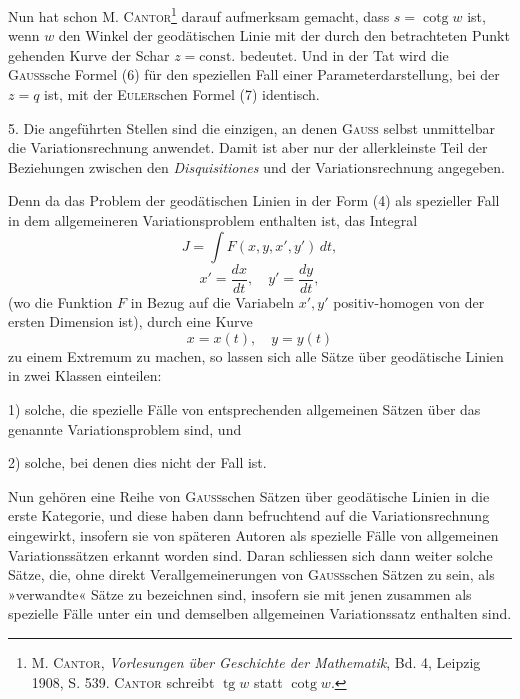 Nun hat schon M. \textsc{Cantor}\footnote{M. \textsc{Cantor}, \textit{Vorlesungen über Geschichte der Mathematik}, Bd. 4, Leipzig 1908, S. 539. \textsc{Cantor}
schreibt $\operatorname{tg} w$ statt $\operatorname{cotg} w$.} darauf aufmerksam gemacht, dass $s=\operatorname{cotg} w$
ist, wenn $w$ den Winkel der geodätischen Linie mit der durch den betrachteten
Punkt gehenden Kurve der Schar $z=\text{const.}$ bedeutet. Und in der Tat wird
die \textsc{Gauss}sche Formel (6) für den speziellen Fall einer Parameterdarstellung,
bei der $z=q$ ist, mit der \textsc{Euler}schen Formel (7) identisch.
\begin{center}\end{center}
\noindent\hspace*{\parindent}5. Die angeführten Stellen sind die einzigen, an denen \textsc{Gauss} selbst
unmittelbar die Variationsrechnung anwendet. Damit ist aber nur der allerkleinste
Teil der Beziehungen zwischen den \textit{Disquisitiones} und der Variationsrechnung
angegeben.

Denn da das Problem der geodätischen Linien in der Form (4) als spezieller
Fall in dem allgemeineren Variationsproblem enthalten ist, das Integral
\begin{equation*}\tag{8}
J=\int F(x,y,x',y')\,dt,
\end{equation*}
\[
x'=\frac{dx}{dt},\quad y'=\frac{dy}{dt},
\]
(wo die Funktion $F$ in Bezug auf die Variabeln $x',y'$ positiv-homogen von
der ersten Dimension ist), durch eine Kurve
\[
x=x(t),\quad y=y(t)
\]
zu einem Extremum zu machen, so lassen sich alle Sätze über geodätische
Linien in zwei Klassen einteilen:
\par\noindent\hspace*{\parindent}1) solche, die spezielle Fälle von entsprechenden allgemeinen Sätzen über
das genannte Variationsproblem sind, und
\par\noindent\hspace*{\parindent}2) solche, bei denen dies nicht der Fall ist.

Nun gehören eine Reihe von \textsc{Gauss}schen Sätzen über geodätische Linien
in die erste Kategorie, und diese haben dann befruchtend auf die Variationsrechnung
eingewirkt, insofern sie von späteren Autoren als spezielle Fälle von
\clearpage{}
\noindent allgemeinen Variationssätzen erkannt worden sind. Daran schliessen sich dann
weiter solche Sätze, die, ohne direkt Verallgemeinerungen von \textsc{Gauss}schen
Sätzen zu sein, als »verwandte« Sätze zu bezeichnen sind, insofern sie mit
jenen zusammen als spezielle Fälle unter ein und demselben allgemeinen
Variationssatz enthalten sind.
\par\clearpage\endgroup
